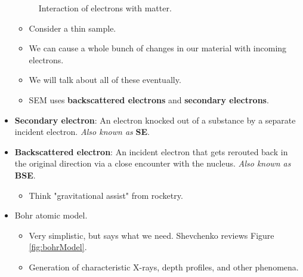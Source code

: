 \documentclass[../notes.tex]{subfiles}
\begin{document}
\begin{itemize}
\begin{figure}[h!]
        \caption{Interaction of electrons with matter.}
        \label{fig:ElectronsMatter}
    \end{figure}
    \begin{itemize}
        \item Consider a thin sample.
        \item We can cause a whole bunch of changes in our material with incoming electrons.
        \item We will talk about all of these eventually.
        \item SEM uses \textbf{backscattered electrons} and \textbf{secondary electrons}.
    \end{itemize}
    \item \textbf{Secondary electron}: An electron knocked out of a substance by a separate incident electron. \emph{Also known as} \textbf{SE}.
    \item \textbf{Backscattered electron}: An incident electron that gets rerouted back in the original direction via a close encounter with the nucleus. \emph{Also known as} \textbf{BSE}.
    \begin{itemize}
        \item Think "gravitational assist" from rocketry.
    \end{itemize}
    \item Bohr atomic model.
    \begin{itemize}
        \item Very simplistic, but says what we need. Shevchenko reviews Figure \ref{fig:bohrModel}.
        \item Generation of characteristic X-rays, depth profiles, and other phenomena.

\end{itemize}
\end{itemize}
\end{document}
